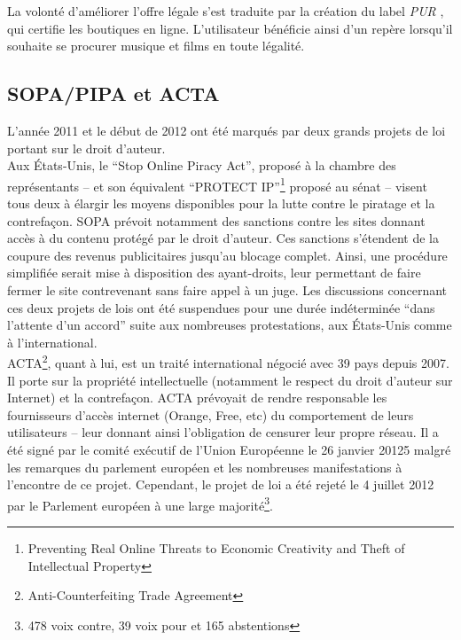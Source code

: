 \documentclass[a4paper]{report}
\begin{document}
		La volonté d'améliorer l'offre légale s'est traduite par la création du label \emph{PUR} \cite{label-pur}, qui certifie les boutiques en ligne. L'utilisateur bénéficie ainsi d'un repère lorsqu'il souhaite se procurer musique et films en toute légalité.

		\subsection{SOPA/PIPA et ACTA}
		L'année 2011 et le début de 2012 ont été marqués par deux grands projets de loi portant sur le droit d'auteur.\\

		Aux États-Unis, le ``Stop Online Piracy Act'', proposé à la chambre des représentants – et son équivalent ``PROTECT IP''\footnote{Preventing Real Online Threats to Economic Creativity and Theft of Intellectual Property} proposé au sénat – visent tous deux à élargir les moyens disponibles pour la lutte contre le piratage et la contrefaçon. SOPA prévoit notamment des sanctions contre les sites donnant accès à du contenu protégé par le droit d'auteur. Ces sanctions s'étendent de la coupure des revenus publicitaires jusqu'au blocage complet. Ainsi, une procédure simplifiée serait mise à disposition des ayant-droits, leur permettant de faire fermer le site contrevenant sans faire appel à un juge. Les discussions concernant ces deux projets de lois ont été suspendues pour une durée indéterminée ``dans l'attente d'un accord'' \cite{suspension-sopa} suite aux nombreuses protestations, aux États-Unis comme à l'international.\\

		ACTA\footnote{Anti-Counterfeiting Trade Agreement}, quant à lui, est un traité international négocié avec 39 pays \cite{no-to-acta} depuis 2007. Il porte sur la propriété intellectuelle (notamment le respect du droit d'auteur sur Internet) et la contrefaçon. ACTA prévoyait de rendre responsable les fournisseurs d'accès internet (Orange, Free, etc) du comportement de leurs utilisateurs – leur donnant ainsi l'obligation de censurer leur propre réseau. Il a été signé par le comité exécutif de l'Union Européenne le 26 janvier 20125 malgré les remarques du parlement européen et les nombreuses manifestations à l'encontre de ce projet. Cependant, le projet de loi a été rejeté le 4 juillet 2012 par le Parlement européen \cite{acta-vote} à une large majorité\footnote{478 voix contre, 39 voix pour et 165 abstentions}.

\end{document}
